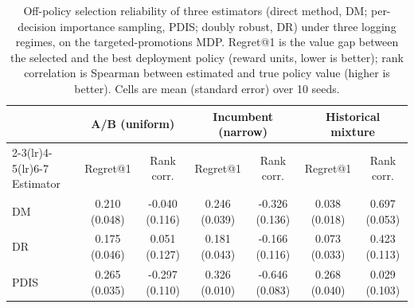 \begin{table}[t]
\centering
\small
\caption{Off-policy selection reliability of three estimators (direct method, DM; per-decision importance sampling, PDIS; doubly robust, DR) under three logging regimes, on the targeted-promotions MDP. Regret@1 is the value gap between the selected and the best deployment policy (reward units, lower is better); rank correlation is Spearman between estimated and true policy value (higher is better). Cells are mean (standard error) over 10 seeds.}
\label{tab:field_ope_reliability}
\begin{tabular}{lcccccc}
\toprule
 & \multicolumn{2}{c}{A/B (uniform)} & \multicolumn{2}{c}{Incumbent (narrow)} & \multicolumn{2}{c}{Historical mixture} \\
\cmidrule(lr){2-3}\cmidrule(lr){4-5}\cmidrule(lr){6-7}
Estimator & Regret@1 & Rank corr. & Regret@1 & Rank corr. & Regret@1 & Rank corr. \\
\midrule
DM & 0.210 (0.048) & -0.040 (0.116) & 0.246 (0.039) & -0.326 (0.136) & 0.038 (0.018) & 0.697 (0.053) \\
DR & 0.175 (0.046) & 0.051 (0.127) & 0.181 (0.043) & -0.166 (0.116) & 0.073 (0.033) & 0.423 (0.113) \\
PDIS & 0.265 (0.035) & -0.297 (0.110) & 0.326 (0.010) & -0.646 (0.083) & 0.268 (0.040) & 0.029 (0.103) \\
\bottomrule
\end{tabular}
\end{table}
